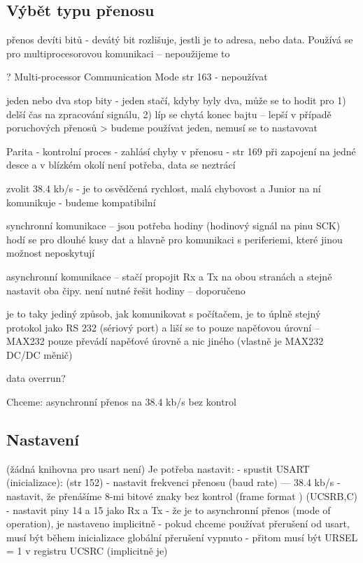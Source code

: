 \subsection{Výbět typu přenosu }


přenos devíti bitů - devátý bit rozlišuje, jestli je to adresa, nebo data. 
Používá se pro multiprocesorovou komunikaci -- nepoužijeme to  

? Multi-processor Communication Mode str 163 - nepoužívat 

jeden nebo dva stop bity - jeden stačí, kdyby byly dva, může se to hodit pro 
1) delší čas na zpracování signálu, 
2) líp se chytá konec bajtu -- lepší v případě poruchových přenosů 
> budeme používat jeden, nemusí se to nastavovat 


 Parita - kontrolní proces - zahlásí chyby v přenosu - str 169 při zapojení na jedné desce a v blízkém okolí není potřeba, data se neztrácí 
 
 zvolit 38.4 kb/s - je to osvědčená rychlost, malá chybovost a Junior na ní komunikuje - budeme kompatibilní 
 
 synchronní komunikace -- jsou potřeba hodiny (hodinový signál na pinu SCK) 
 hodí se pro dlouhé kusy dat a hlavně pro komunikaci s periferiemi, které jinou možnost neposkytují 
 
 asynchronní komunikace -- stačí propojit Rx a Tx na obou stranách a stejně nastavit oba čipy. není nutné řešit hodiny --  doporučeno   
 
 je to taky jediný způsob, jak komunikovat s počítačem, je to úplně stejný protokol jako RS 232 (sériový port) a liší se to pouze napěťovou úrovní -- MAX232 pouze převádí napěťové úrovně a nic jiného (vlastně je MAX232 DC/DC měnič)
 
 data overrun? 
 
Chceme: asynchronní přenos na 38.4 kb/s bez kontrol  


\subsection{Nastavení}

(žádná knihovna pro usart není)
Je potřeba nastavit: 
- spustit USART (inicializace):  (str 152)
   - nastavit frekvenci přenosu (baud rate)  --- 38.4 kb/s 
   - nastavit, že přenášíme 8-mi bitové znaky bez kontrol  (frame format ) (UCSRB,C)
   - nastavit piny 14 a 15 jako Rx a Tx 
   - že je to  asynchronní přenos (mode of operation), je nastaveno implicitně 
   - pokud chceme používat přerušení od usart, musí být během inicializace 
     globální přerušení vypnuto 
   - přitom musí být URSEL = 1 v registru UCSRC (implicitně je)
 


 
 



 

 

